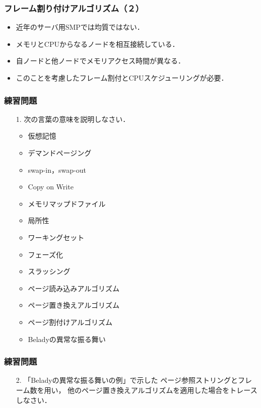 \documentclass[handout]{beamer}                   %
\begin{document}
\begin{frame}
  \frametitle{フレーム割り付けアルゴリズム（２）}
  \begin{itemize}
  \item 近年のサーバ用SMPでは均質ではない．
  \item メモリとCPUからなるノードを相互接続している．
  \item 自ノードと他ノードでメモリアクセス時間が異なる．
  \item このことを考慮したフレーム割付とCPUスケジューリングが必要．
  \end{itemize}
\end{frame}


\begin{frame}
  \frametitle{練習問題}
  \begin{enumerate}
  \item[1.] 次の言葉の意味を説明しなさい．
    \begin{itemize}
    \item 仮想記憶
    \item デマンドページング
    \item swap-in，swap-out
    \item Copy on Write
    \item メモリマップドファイル
    \item 局所性
    \item ワーキングセット
    \item フェーズ化
    \item スラッシング
    \item ページ読み込みアルゴリズム
    \item ページ置き換えアルゴリズム
    \item ページ割付けアルゴリズム
    \item Beladyの異常な振る舞い
    \end{itemize}
  \end{enumerate}
\end{frame}

\begin{frame}
  \frametitle{練習問題}
  \begin{enumerate}
  \item[2.] 「Beladyの異常な振る舞いの例」で示した
    ページ参照ストリングとフレーム数を用い，
    他のページ置き換えアルゴリズムを適用した場合をトレースしなさい．
  \end{enumerate}
  \vfill
  \vfill
\end{frame}
\end{document}
